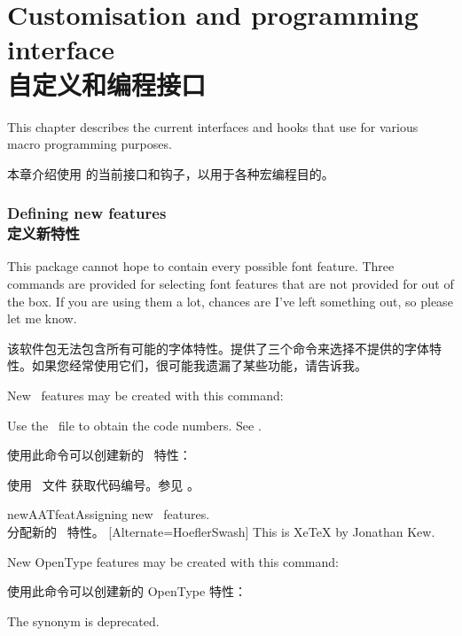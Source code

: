 \documentclass[a4paper]{l3doc}
\begin{document}
\part{Customisation and programming interface\\自定义和编程接口}

This chapter describes the current interfaces and hooks that use
 for various macro programming purposes.

本章介绍使用  的当前接口和钩子，以用于各种宏编程目的。

\section{Defining new features\\定义新特性} \label{sec:newfeatures}
This package cannot hope to contain every possible font
feature. Three commands are provided for selecting font features
that are not provided for out of the box. If you are using
them a lot, chances are I've left something out, so please let me
know.

该软件包无法包含所有可能的字体特性。提供了三个命令来选择不提供的字体特性。如果您经常使用它们，很可能我遗漏了某些功能，请告诉我。

\DescribeMacro{\newAATfeature}
New \AAT\ features may be created with this command:\par
{\centering\cmd\newAATfeature{}\par}\noindent
Use the \XeTeX\ file  to obtain the code numbers.
See .

使用此命令可以创建新的 \AAT\ 特性：\par
{\centering\cmd\newAATfeature{}\par}\noindent
使用 \XeTeX\ 文件  获取代码编号。参见 。

\begin{Xexample}{newAATfeat}{Assigning new \AAT\ features.\\分配新的 \AAT\ 特性。}
  [Alternate=HoeflerSwash]
   This is XeTeX by Jonathan Kew.
\end{Xexample}


\DescribeMacro{\newopentypefeature}
New OpenType features may be created with this command:\par
使用此命令可以创建新的 OpenType 特性：\par
{\centering\cmd\newopentypefeature{}\par}
The synonym  is deprecated.
\end{document}
